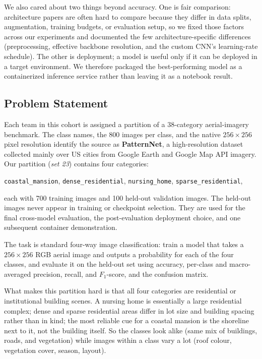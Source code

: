 \documentclass[11pt,twoside,a4paper]{article}
\begin{document}
We also cared about two things beyond accuracy. One is fair comparison:
architecture papers are often hard to compare because they differ in data
splits, augmentation, training budgets, or evaluation setup, so we fixed those
factors across our experiments and documented the few architecture-specific
differences (preprocessing, effective backbone resolution, and the custom
CNN's learning-rate schedule). The other is deployment; a model is useful only
if it can be deployed in a target environment. We therefore packaged the
best-performing model
as a containerized inference service rather than leaving it as a notebook
result.

\subsection{Problem Statement}
Each team in this cohort is assigned a partition of a 38-category aerial-imagery benchmark. The class names, the 800 images per class, and the native $256 \times 256$ pixel resolution identify the source as \textbf{PatternNet}, a high-resolution dataset collected mainly over US cities from Google Earth and Google Map API imagery. Our partition (\emph{set 23}) contains four categories:
\begin{center}
\texttt{coastal\_mansion}, \quad \texttt{dense\_residential}, \quad
\texttt{nursing\_home}, \quad \texttt{sparse\_residential},
\end{center}
each with 700 training images and 100 held-out validation images. The held-out
images never appear in training or checkpoint selection. They are used for the
final cross-model evaluation, the post-evaluation deployment choice, and one
subsequent container demonstration.

The task is standard four-way image classification: train a model that takes a
$256 \times 256$ RGB aerial image and outputs a probability for each of the
four classes, and evaluate it on the held-out set using accuracy, per-class
and macro-averaged precision, recall, and $F_1$-score, and the confusion
matrix.

What makes this partition hard is that all four categories are residential or
institutional building scenes. A nursing home is essentially a large
residential complex; dense and sparse residential areas differ in lot size and
building spacing rather than in kind; the most reliable cue for a coastal
mansion is the shoreline next to it, not the building itself. So the classes
look alike (same mix of buildings, roads, and vegetation) while images within
a class vary a lot (roof colour, vegetation cover, season, layout).
\end{document}
